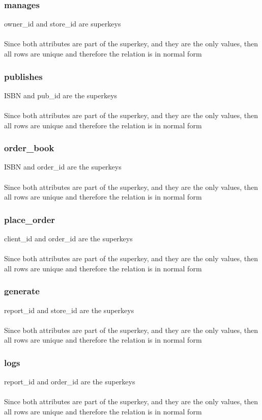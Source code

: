 \documentclass[Project Report]{article}
\begin{document}
\subsubsection{manages}
owner\_id and store\_id are superkeys\\\\
Since both attributes are part of the superkey, and they are the only values, then all rows are unique and therefore the relation is in normal form

\subsubsection{publishes}
ISBN and pub\_id are the superkeys\\\\
Since both attributes are part of the superkey, and they are the only values, then all rows are unique and therefore the relation is in normal form

\subsubsection{order\_book}
ISBN and order\_id are the superkeys\\\\
Since both attributes are part of the superkey, and they are the only values, then all rows are unique and therefore the relation is in normal form

\subsubsection{place\_order}
client\_id and order\_id are the superkeys\\\\
Since both attributes are part of the superkey, and they are the only values, then all rows are unique and therefore the relation is in normal form

\subsubsection{generate}
report\_id and store\_id are the superkeys\\\\
Since both attributes are part of the superkey, and they are the only values, then all rows are unique and therefore the relation is in normal form

\subsubsection{logs}
report\_id and order\_id are the superkeys\\\\
Since both attributes are part of the superkey, and they are the only values, then all rows are unique and therefore the relation is in normal form
\end{document}
